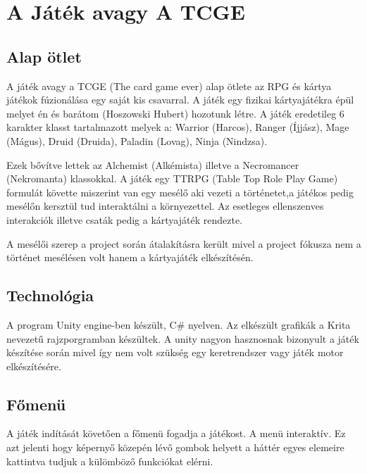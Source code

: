 \chapter{A Játék avagy A TCGE}

\section{Alap ötlet}

A játék avagy a TCGE (The card game ever) alap ötlete az RPG és kártya játékok fúzionálása egy saját kis csavarral. A játék egy fizikai kártyajátékra épül melyet én és barátom (Hoszowski Hubert) hozotunk létre. A játék eredetileg 6 karakter klasst tartalmazott melyek a: Warrior (Harcos), Ranger (Íjjász), Mage (Mágus), Druid (Druida), Paladin (Lovag), Ninja (Nindzsa). 

Ezek bővítve lettek az Alchemist (Alkémista) illetve a Necromancer (Nekromanta) klassokkal. A játék egy TTRPG (Table Top Role Play Game) formulát követte miszerint van egy mesélő aki vezeti a történetet,a játékos pedig mesélőn kersztül tud interaktálni a környezettel. Az esetleges ellenszenves interakciók illetve csaták pedig a kártyajáték rendezte.

A mesélői szerep a project során átalakításra került mivel a project fókusza nem a történet mesélésen volt hanem a kártyajáték elkészítésén.


\section{Technológia}

A program Unity engine-ben készült, C\# nyelven. Az elkészült grafikák a Krita nevezetű rajzporgramban készültek. A unity nagyon hasznosnak bizonyult a játék készítése során mivel így nem volt szükség egy keretrendszer vagy játék motor elkészítésére.   

\clearpage
\section{Főmenü}

A játék indítását követően a főmenü fogadja a játékost. A menü interaktív. Ez azt jelenti hogy képernyő közepén lévő gombok helyett a háttér egyes elemeire kattintva tudjuk a külömböző funkciókat elérni.

